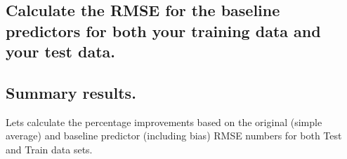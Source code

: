 \documentclass[]{article}
\begin{document}
\hypertarget{calculate-the-rmse-for-the-baseline-predictors-for-both-your-training-data-and-your-test-data.}{%
\subsection{Calculate the RMSE for the baseline predictors for both your
training data and your test
data.}\label{calculate-the-rmse-for-the-baseline-predictors-for-both-your-training-data-and-your-test-data.}}

\hypertarget{summary-results.}{%
\subsection{Summary results.}\label{summary-results.}}

Lets calculate the percentage improvements based on the original (simple
average) and baseline predictor (including bias) RMSE numbers for both
Test and Train data sets.
\end{document}
